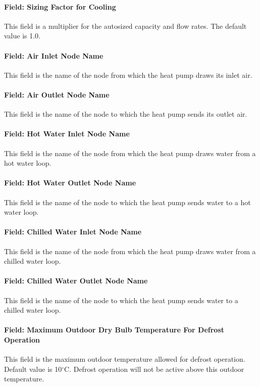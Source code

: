 \paragraph{Field: Sizing Factor for Cooling} This field is a multiplier for the
autosized capacity and flow rates. The default value is 1.0.
\paragraph{Field: Air Inlet Node Name} This field is the name of the node from
which the heat pump draws its inlet air.
\paragraph{Field: Air Outlet Node Name} This field is the name of the node to
which the heat pump sends its outlet air.
\paragraph{Field: Hot Water Inlet Node Name} This field is the name of the node
from which the heat pump draws water from a hot water loop.
\paragraph{Field: Hot Water Outlet Node Name} This field is the name of the node
to which the heat pump sends water to a hot water loop.
\paragraph{Field: Chilled Water Inlet Node Name} This field is the name of the
node from which the heat pump draws water from a chilled water loop.
\paragraph{Field: Chilled Water Outlet Node Name} This field is the name of the
node to which the heat pump sends water to a chilled water loop.
\paragraph{Field: Maximum Outdoor Dry Bulb Temperature For Defrost Operation}
This field is the maximum outdoor temperature allowed for defrost operation.
Default value is 10$^\circ$C. Defrost operation will not be active above this
outdoor temperature.
